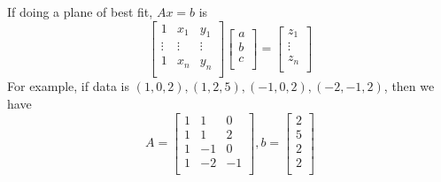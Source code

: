 \documentclass{article}
\begin{document}
\begin{example}
  If doing a plane of best fit, $Ax = b$ is \[
    \begin{bmatrix}
      1      & x_1    & y_1    \\
      \vdots & \vdots & \vdots \\
      1      & x_n    & y_n    \\
    \end{bmatrix}
    \begin{bmatrix}
      a \\b\\c\\
    \end{bmatrix} =
    \begin{bmatrix}
      z_1 \\\vdots\\z_n\\
    \end{bmatrix}
  \]
  For example, if data is $(1, 0, 2), (1, 2, 5), (-1, 0, 2), (-2, -1, 2)$, then we have \[
    A=
    \begin{bmatrix}
      1 & 1  & 0  \\
      1 & 1  & 2  \\
      1 & -1 & 0  \\
      1 & -2 & -1 \\
    \end{bmatrix}, b =
    \begin{bmatrix}
      2 \\5\\2\\2\\
    \end{bmatrix}
  \]
\end{example}
\end{document}
